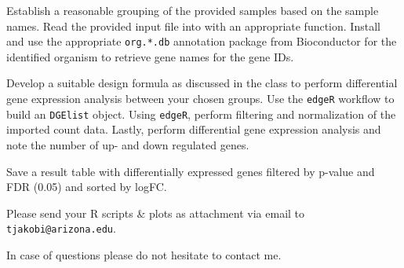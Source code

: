 \documentclass[11pt,largemargins, letter]{homework}
\begin{document}
 \begin{alphaparts}

   \questionpart Establish a reasonable grouping of the provided samples based on the sample names.
   \questionpart Read the provided input file into \faRProject \hspace{0.1mm} with an appropriate function.
   \questionpart Install and use the appropriate \texttt{org.*.db} annotation package from Bioconductor for the identified organism to retrieve gene names for the gene IDs.
 \end{alphaparts}

\question

 \begin{alphaparts}
   \questionpart Develop a suitable design formula as discussed in the class to perform differential gene expression analysis between your chosen groups.
   \questionpart Use the \texttt{edgeR} workflow to build an \texttt{DGElist} object.
   \questionpart Using \texttt{edgeR}, perform filtering and normalization of the imported count data.
   \questionpart Lastly, perform differential gene expression analysis and note the number of up- and down regulated genes.
 \end{alphaparts}

\question

 \begin{alphaparts}
   \questionpart Save a result table with differentially expressed genes filtered by p-value and FDR (0.05) and sorted by logFC.
 \end{alphaparts}


Please send your R scripts \& plots as attachment via email to \texttt{tjakobi@arizona.edu}.

In case of questions please do not hesitate to contact me.
\end{document}
